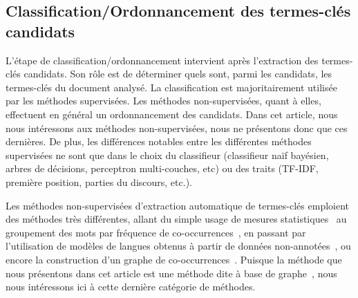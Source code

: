   \subsection{Classification/Ordonnancement des termes-clés candidats}
  \label{subsec:classification_ordonnancement_des_termes_cles_candidats}
    L'étape de classification/ordonnancement intervient après l'extraction des
    termes-clés candidats. Son rôle est de déterminer quels sont, parmi les
    candidats, les termes-clés du document analysé. La classification est
    majoritairement utilisée par les méthodes supervisées. Les méthodes
    non-supervisées, quant à elles,  effectuent en général un ordonnancement des
    candidats. Dans cet article, nous nous intéressons aux méthodes
    non-supervisées, nous ne présentons donc que ces dernières. De plus, les
    différences notables entre les différentes méthodes supervisées ne sont que
    dans le choix du classifieur (classifieur naïf bayésien, arbres de
    décisions, perceptron multi-couches, etc) ou des traits (TF-IDF, première
    position, parties du discours, etc.).

    Les méthodes non-supervisées d'extraction automatique de termes-clés
    emploient des méthodes très différentes, allant du simple usage de mesures
    statistiques~\cite{jones1972tfidf,paukkeri2010likey} au groupement des mots
    par fréquence de co-occurrences~\cite{liu2009keycluster}, en passant par
    l'utilisation de modèles de langues obtenus à partir de données
    non-annotées~\cite{tomokiyo2003languagemodel}, ou encore la construction
    d'un graphe de co-occurrences~\cite{mihalcea2004textrank}. Puisque la
    méthode que nous présentons dans cet article est une méthode dite
    \og à base de graphe~\fg, nous nous intéressons ici à cette dernière
    catégorie de méthodes.

